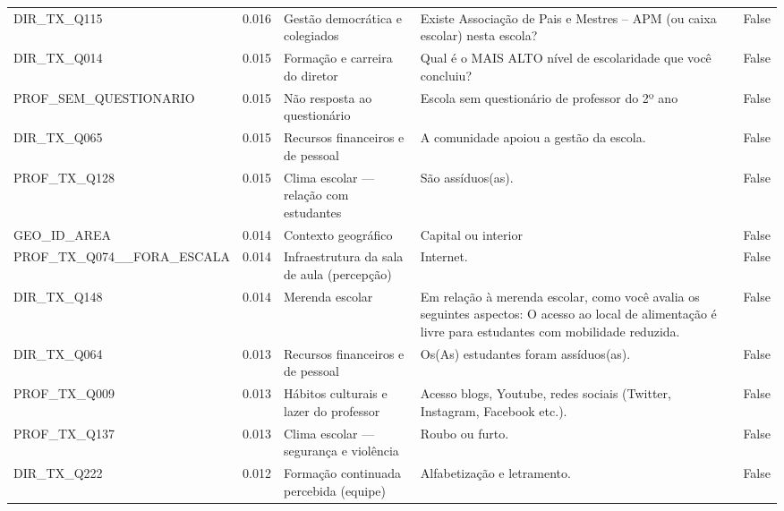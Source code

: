\begin{tabular}{lrllr}
DIR\_TX\_Q115 & 0.016 & Gestão democrática e colegiados & Existe Associação de Pais e Mestres – APM (ou caixa escolar) nesta escola? & False \\
DIR\_TX\_Q014 & 0.015 & Formação e carreira do diretor & Qual é o MAIS ALTO nível de escolaridade que você concluiu? & False \\
PROF\_SEM\_QUESTIONARIO & 0.015 & Não resposta ao questionário & Escola sem questionário de professor do 2º ano & False \\
DIR\_TX\_Q065 & 0.015 & Recursos financeiros e de pessoal & A comunidade apoiou a gestão da escola. & False \\
PROF\_TX\_Q128 & 0.015 & Clima escolar — relação com estudantes & São assíduos(as). & False \\
GEO\_ID\_AREA & 0.014 & Contexto geográfico & Capital ou interior & False \\
PROF\_TX\_Q074\_\_FORA\_ESCALA & 0.014 & Infraestrutura da sala de aula (percepção) & Internet. & False \\
DIR\_TX\_Q148 & 0.014 & Merenda escolar & Em relação à merenda escolar, como você avalia os seguintes aspectos: O acesso ao local de alimentação é livre para estudantes com mobilidade reduzida. & False \\
DIR\_TX\_Q064 & 0.013 & Recursos financeiros e de pessoal & Os(As) estudantes foram assíduos(as). & False \\
PROF\_TX\_Q009 & 0.013 & Hábitos culturais e lazer do professor & Acesso blogs, Youtube, redes sociais (Twitter, Instagram, Facebook etc.). & False \\
PROF\_TX\_Q137 & 0.013 & Clima escolar — segurança e violência & Roubo ou furto. & False \\
DIR\_TX\_Q222 & 0.012 & Formação continuada percebida (equipe) & Alfabetização e letramento. & False \\
\bottomrule
\end{tabular}
